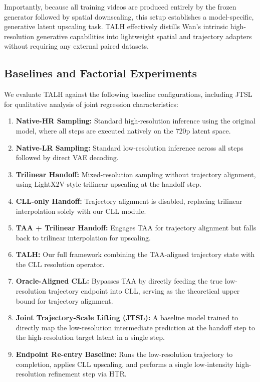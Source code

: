 Importantly, because all training videos are produced entirely by the
frozen generator followed by spatial downscaling, this setup establishes
a model-specific, generative latent upscaling task. TALH effectively
distills Wan's intrinsic high-resolution generative capabilities into
lightweight spatial and trajectory adapters without requiring any
external paired datasets.

\subsection{Baselines and Factorial Experiments}
\label{sec:factorialsetup}

We evaluate TALH against the following baseline configurations,
including JTSL for qualitative analysis of joint regression
characteristics:

\begin{enumerate}
\def\labelenumi{\arabic{enumi}.}
\item
  \textbf{Native-HR Sampling:} Standard high-resolution inference using
  the original model, where all steps are executed natively on the
  \(720\text{p}\) latent space.
\item
  \textbf{Native-LR Sampling:} Standard low-resolution inference across
  all steps followed by direct VAE decoding.
\item
  \textbf{Trilinear Handoff:} Mixed-resolution sampling without
  trajectory alignment, using LightX2V-style trilinear upscaling at the
  handoff step.
\item
  \textbf{CLL-only Handoff:} Trajectory alignment is disabled, replacing
  trilinear interpolation solely with our CLL module.
\item
  \textbf{TAA + Trilinear Handoff:} Engages TAA for trajectory alignment
  but falls back to trilinear interpolation for upscaling.
\item
  \textbf{TALH:} Our full framework combining the TAA-aligned trajectory
  state with the CLL resolution operator.
\item
  \textbf{Oracle-Aligned CLL:} Bypasses TAA by directly feeding the true
  low-resolution trajectory endpoint into CLL, serving as the
  theoretical upper bound for trajectory alignment.
\item
  \textbf{Joint Trajectory-Scale Lifting (JTSL):} A baseline model
  trained to directly map the low-resolution intermediate prediction at
  the handoff step to the high-resolution target latent in a single
  step.
\item
  \textbf{Endpoint Re-entry Baseline:} Runs the low-resolution
  trajectory to completion, applies CLL upscaling, and performs a single
  low-intensity high-resolution refinement step via HTR.
\end{enumerate}

